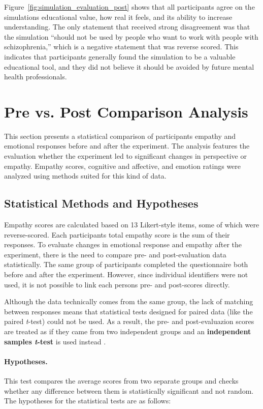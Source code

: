 Figure~\ref{fig:simulation_evaluation_post} shows that all participants agree on the simulations educational value, how real it feels, and its ability to increase understanding. The only statement that received strong disagreement was that the simulation “should not be used by people who want to work with people with schizophrenia,” which is a negative statement that was reverse scored. This indicates that participants generally found the simulation to be a valuable educational tool, and they did not believe it should be avoided by future mental health professionals.

\section{Pre vs. Post Comparison Analysis}
\label{sec:pre_post_comparison}
This section presents a statistical comparison of participants empathy and emotional responses before and after the experiment. The analysis features the evaluation whether the experiment led to significant changes in perspective or empathy. Empathy scores, cognitive and affective, and emotion ratings were analyzed using methods suited for this kind of data.

\subsection{Statistical Methods and Hypotheses}

Empathy scores are calculated based on 13 Likert-style items, some of which were reverse-scored. Each participants total empathy score is the sum of their responses. To evaluate changes in emotional response and empathy after the experiment, there is the need to compare pre- and post-evaluation data statistically. The same group of participants completed the questionnaire both before and after the experiment. However, since individual identifiers were not used, it is not possible to link each persons pre- and post-scores directly.

Although the data technically comes from the same group, the lack of matching between responses means that statistical tests designed for paired data (like the paired \textit{t}-test) could not be used. As a result, the pre- and post-evaluazion scores are treated as if they came from two independent groups and an \textbf{independent samples \textit{t}-test} is used instead \cite{independentTtest}.

\paragraph{Hypotheses.} This test compares the average scores from two separate groups and checks whether any difference between them is statistically significant and not random. The hypotheses for the statistical tests are as follows:

